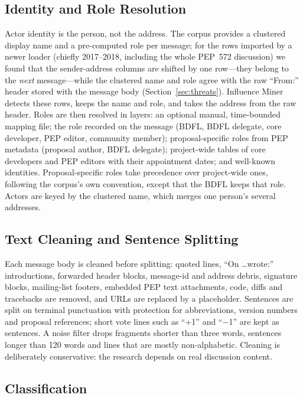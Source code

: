 \documentclass[sigconf,screen]{acmart}
\begin{document}
\subsection{Identity and Role Resolution}
\label{sec:roles}

Actor identity is the person, not the address. The corpus provides a clustered display name and a pre-computed role per message; for the rows imported by a newer loader (chiefly 2017--2018, including the whole PEP~572 discussion) we found that the sender-address columns are shifted by one row---they belong to the \emph{next} message---while the clustered name and role agree with the raw ``From:'' header stored with the message body (Section~\ref{sec:threats}). Influence Miner detects these rows, keeps the name and role, and takes the address from the raw header. Roles are then resolved in layers: an optional manual, time-bounded mapping file; the role recorded on the message (BDFL, BDFL delegate, core developer, PEP editor, community member); proposal-specific roles from PEP metadata (proposal author, BDFL delegate); project-wide tables of core developers and PEP editors with their appointment dates; and well-known identities. Proposal-specific roles take precedence over project-wide ones, following the corpus's own convention, except that the BDFL keeps that role. Actors are keyed by the clustered name, which merges one person's several addresses.

\subsection{Text Cleaning and Sentence Splitting}
\label{sec:cleaning}

Each message body is cleaned before splitting: quoted lines, ``On \ldots wrote:'' introductions, forwarded header blocks, message-id and address debris, signature blocks, mailing-list footers, embedded PEP text attachments, code, diffs and tracebacks are removed, and URLs are replaced by a placeholder. Sentences are split on terminal punctuation with protection for abbreviations, version numbers and proposal references; short vote lines such as ``+1'' and ``$-$1'' are kept as sentences. A noise filter drops fragments shorter than three words, sentences longer than 120 words and lines that are mostly non-alphabetic. Cleaning is deliberately conservative: the research depends on real discussion content.

\subsection{Classification}
\label{sec:classification}
\end{document}

